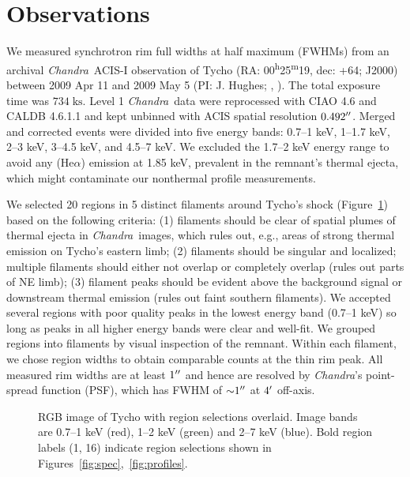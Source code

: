 \documentclass[iop, apj, numberedappendix, twocolappendix]{emulateapj}
\newcommand*{\mt}{\mathrm}
\newcommand*{\unit}[1]{\;\mt{#1}}  %
\newcommand*{\abt}{\mathord{\sim}} %
\newcommand*{\tsup}{\textsuperscript}
\newcommand*{\Chandra}{\textit{Chandra}\ }
\begin{document}
\section{Observations}
\label{sec:observations}

We measured synchrotron rim full widths at half maximum (FWHMs) from an
archival \Chandra ACIS-I observation of Tycho
(RA: 00\tsup{h}25\tsup{m}19, dec: +64; J2000)
between 2009 Apr 11 and 2009 May 5 (PI: J. Hughes;
,
).
The total exposure time was $734 \unit{ks}$.
Level 1 \Chandra data were reprocessed with CIAO 4.6 and CALDB 4.6.1.1 and kept
unbinned with ACIS spatial resolution $0.492\mbox{$^{\prime\prime}$}$.
Merged and corrected events were divided into five energy bands:
0.7--1 keV, 1--1.7 keV, 2--3 keV, 3--4.5 keV, and 4.5--7 keV.
We excluded the 1.7--2 keV energy range to avoid any  (He$\alpha$)
emission at 1.85 keV, prevalent in the remnant's thermal ejecta, which
might contaminate our nonthermal profile measurements.

We selected 20 regions in 5 distinct filaments around Tycho's shock
(Figure~\ref{fig:snr}) based on the following criteria: (1) filaments should be
clear of spatial plumes of thermal ejecta in \Chandra images, which rules out,
e.g., areas of strong thermal emission on Tycho's eastern limb; (2) filaments
should be singular and localized; multiple filaments should either not
overlap or completely overlap (rules out parts of NE limb); (3) filament
peaks should be evident above the background signal or downstream thermal
emission (rules out faint southern filaments).  We accepted several
regions with poor quality peaks in the lowest energy band (0.7--1 keV) so long
as peaks in all higher energy bands were clear and well-fit.
We grouped regions into filaments by visual inspection of the remnant.
Within each filament, we chose region widths to obtain comparable counts
at the thin rim peak.
All measured rim widths are at least $1\mbox{$^{\prime\prime}$}$ and hence are resolved by
\textit{Chandra}'s point-spread function (PSF), which has FWHM of
$\abt 1\arcsec$ at $4\mbox{$^\prime$}$ off-axis.

\begin{figure}
    \centering
    \caption{RGB image of Tycho with region selections overlaid.  Image bands
    are 0.7--1 keV (red), 1--2 keV (green) and 2--7 keV (blue).  Bold region
    labels (1, 16) indicate region selections shown in
    Figures~\ref{fig:spec},~\ref{fig:profiles}.
     \label{fig:snr}}
\end{figure}
\end{document}
